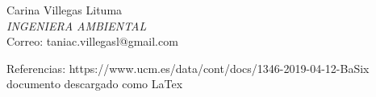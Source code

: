 \documentclass{beamer}
\begin{document}
\begin{frame}
    Carina Villegas Lituma\\ 
    
    \textit{INGENIERA AMBIENTAL}\\ 
    
    Correo: taniac.villegasl@gmail.com\\
    
\end{frame}

Referencias:
https://www.ucm.es/data/cont/docs/1346-2019-04-12-BaSix%
documento descargado como LaTex
\end{document}
